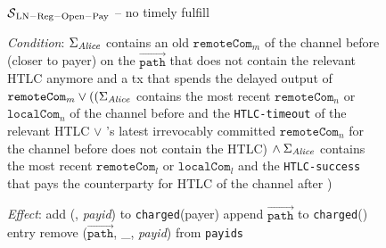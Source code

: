 \begin{figure}[H]
  \begin{simulatorbox}{$\mathcal{S}{}_{\mathrm{LN - Reg - Open - Pay}}$ -- no
  timely fulfill}
    \begin{algorithmic}[1]
      \Statex \textit{Condition}:
      \Indent
        \State $\Sigma_{\mathit{Alice}}$ contains an old $\mathtt{remoteCom}_m$ of the
        channel before \alice{} (closer to payer) on the
        $\overrightarrow{\mathtt{path}}$ that does not contain the relevant HTLC
        anymore and a tx that spends the delayed output of $\mathtt{remoteCom}_m
        \vee ((\Sigma_{\mathit{Alice}}$ contains the most recent $\mathtt{remoteCom}_n$
        or $\mathtt{localCom}_n$ of the channel before \alice{} and the
        \texttt{HTLC-timeout} of the relevant HTLC $\vee$ \alice's latest
        irrevocably committed $\mathtt{remoteCom}_n$ for the channel before
        \alice{} does not contain the HTLC) $\wedge \: \Sigma_{\mathit{Alice}}$ contains
        the most recent $\mathtt{remoteCom}_l$ or $\mathtt{localCom}_l$ and the
        \texttt{HTLC-success} that pays the counterparty for HTLC of the channel
        after \alice{})
        \label{alg:sim:resolvepay:nofulfill:cond}
      \EndIndent
      \Statex

      \Statex \textit{Effect}:
      \Indent
        \State add (\alice, \textit{payid}) to \texttt{charged}(payer)
          \State append $\overrightarrow{\mathtt{path}}$ to
          \texttt{charged}(\alice) entry
        \EndIf
        \State remove ($\overrightarrow{\mathtt{path}}$, \_, \textit{payid}) from
        \texttt{payids}
      \EndIndent
    \end{algorithmic}
  \end{simulatorbox}
  \caption{}
  \label{alg:sim:resolvepay:nofulfill}
\end{figure}

